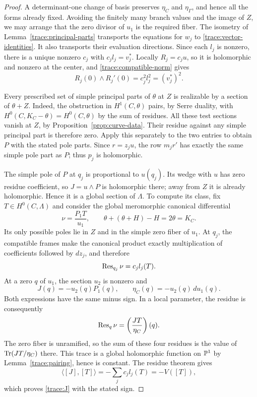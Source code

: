 \begin{proof}
A determinant-one change of basis preserves $\eta_C$ and
$\eta_\Gamma$, and hence all the forms already fixed.  Avoiding the
finitely many branch values and the image of $Z$, we may arrange that
the zero divisor of $u_1$ is the required fiber.  The isometry of
Lemma~\ref{trace:principal-parts} transports the equations for $w_j$
to \eqref{trace:vector-identities}.  It also transports their evaluation
directions.  Since each $l_j$ is nonzero, there is a unique nonzero
$c_j$ with $c_jl_j=v_j^*$.
Locally $R_j=c_ju$, so it is holomorphic and nonzero at the center, and
\eqref{trace:compatible-norm} gives
\[
 R_j(0)\wedge R_j'(0)=c_j^2l_j^2=(v_j^*)^2.
\]

Every prescribed set of simple principal parts of $\theta$ at $Z$
is realizable by a section of $\theta+Z$.  Indeed, the obstruction in
$H^1(C,\theta)$ pairs, by Serre duality, with
$H^0(C,K_C-\theta)=H^0(C,\theta)$ by the sum of residues.
All these test sections vanish at $Z$, by
Proposition~\ref{prop:curve-data}.  Their residue against any simple
principal part is therefore zero.  Apply this separately to the two
entries to obtain $P$ with the stated pole parts.  Since
$r=z_ju$, the row $m_jr'$ has exactly the same simple pole part as $P$;
thus $p_j$ is holomorphic.

The simple pole of $P$ at $q_j$ is proportional to $u(q_j)$.  Its
wedge with $u$ has zero residue coefficient, so $J=u\wedge P$ is
holomorphic there; away from $Z$ it is already holomorphic.  Hence it
is a global section of $\Lambda$.  To compute its class, fix
$T\in H^0(C,\Lambda)$ and consider the global meromorphic canonical
differential
\[
 \nu=\frac{P_1T}{u_1},
 \qquad \theta+(\theta+H)-H=2\theta=K_C.
\]
Its only possible poles lie in $Z$ and in the simple zero fiber of
$u_1$.  At $q_j$, the compatible frames make the canonical product
exactly multiplication of coefficients followed by $dz_j$, and therefore
\[
 \operatorname{Res}_{q_j}\nu=c_jl_j(T).
\]
At a zero $q$ of $u_1$, the section $u_2$ is nonzero and
\[
 J(q)=-u_2(q)P_1(q),\qquad
 \eta_C(q)=-u_2(q)\,du_1(q).
\]
Both expressions have the same minus sign.  In a local parameter,
the residue is consequently
\[
 \operatorname{Res}_q\nu=\left(\frac{JT}{\eta_C}\right)(q).
\]
The zero fiber is unramified, so the sum of these four residues is
the value of $\operatorname{Tr}(JT/\eta_C)$ there.  This trace is a global
holomorphic function on $\mathbb P^1$ by Lemma~\ref{trace:pairing}, hence
is constant.  The residue theorem gives
\[
 \langle[J],[T]\rangle
       =-\sum_jc_jl_j(T)=-V([T]),
\]
which proves \eqref{trace:J} with the stated sign.


\end{proof}
